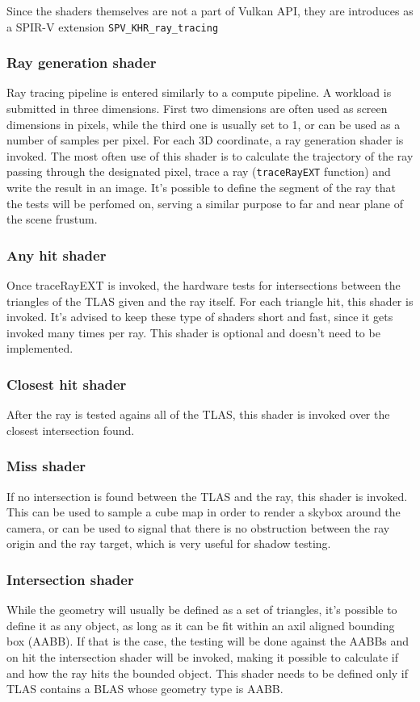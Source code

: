 \documentclass[times, utf8, zavrsni, numeric]{fer}
\begin{document}
Since the shaders themselves are not a part of Vulkan API, they are introduces as a SPIR-V extension \texttt{SPV\_KHR\_ray\_tracing}

\subsubsection{Ray generation shader}
Ray tracing pipeline is entered similarly to a compute pipeline. A workload is submitted in three dimensions. First two dimensions are often used as screen dimensions in pixels, while the third one is usually set to 1, or can be used as a number of samples per pixel. For each 3D coordinate, a ray generation shader is invoked. The most often use of this shader is to calculate the trajectory of the ray passing through the designated pixel, trace a ray (\texttt{traceRayEXT} function) and write the result in an image. It's possible to define the segment of the ray that the tests will be perfomed on, serving a similar purpose to far and near plane of the scene frustum.

\subsubsection{Any hit shader}
Once traceRayEXT is invoked, the hardware tests for intersections between the triangles of the TLAS given and the ray itself. For each triangle hit, this shader is invoked. It's advised to keep these type of shaders short and fast, since it gets invoked many times per ray. This shader is optional and doesn't need to be implemented.

\subsubsection{Closest hit shader}
After the ray is tested agains all of the TLAS, this shader is invoked over the closest intersection found.

\subsubsection{Miss shader}
If no intersection is found between the TLAS and the ray, this shader is invoked. This can be used to sample a cube map in order to render a skybox around the camera, or can be used to signal that there is no obstruction between the ray origin and the ray target, which is very useful for shadow testing.

\subsubsection{Intersection shader}
While the geometry will usually be defined as a set of triangles, it's possible to define it as any object, as long as it can be fit within an axil aligned bounding box (AABB). If that is the case, the testing will be done against the AABBs and on hit the intersection shader will be invoked, making it possible to calculate if and how the ray hits the bounded object. This shader needs to be defined only if TLAS contains a BLAS whose geometry type is AABB.
\end{document}
